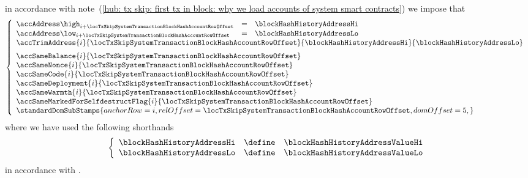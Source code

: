 \item[\underline{Loading the \inst{BLOCKHASH} system smart contract:}] 
	in accordance with
	note~(\ref{hub: tx skip: first tx in block: why we load accounts of system smart contracts})
	we impose that
	\[
		\left\{ \begin{array}{lclr}
			\accAddress  \high _{i + \locTxSkipSystemTransactionBlockHashAccountRowOffset} & = & \blockHashHistoryAddressHi \\
			\accAddress  \low  _{i + \locTxSkipSystemTransactionBlockHashAccountRowOffset} & = & \blockHashHistoryAddressLo \\
			\multicolumn{4}{l}{
				\accTrimAddress
				{i}{\locTxSkipSystemTransactionBlockHashAccountRowOffset}
				{\blockHashHistoryAddressHi}
				{\blockHashHistoryAddressLo}} \vspace{2mm} \\
			\multicolumn{3}{l}{\accSameBalance                       {i}{\locTxSkipSystemTransactionBlockHashAccountRowOffset}} \\
			\multicolumn{3}{l}{\accSameNonce                         {i}{\locTxSkipSystemTransactionBlockHashAccountRowOffset}} \\
			\multicolumn{3}{l}{\accSameCode                          {i}{\locTxSkipSystemTransactionBlockHashAccountRowOffset}} \\
			\multicolumn{3}{l}{\accSameDeployment                    {i}{\locTxSkipSystemTransactionBlockHashAccountRowOffset}} \\
			\multicolumn{3}{l}{\accSameWarmth                        {i}{\locTxSkipSystemTransactionBlockHashAccountRowOffset}} \\
			\multicolumn{3}{l}{\accSameMarkedForSelfdestructFlag     {i}{\locTxSkipSystemTransactionBlockHashAccountRowOffset}} \\
			\multicolumn{3}{l}{
				\standardDomSubStamps {
					anchorRow = i                                                    ,
					relOffset = \locTxSkipSystemTransactionBlockHashAccountRowOffset ,
					domOffset = 5                                                    ,
				}
			} \\
		\end{array} \right.
	\]
	where we have used the following shorthands
	\[
		\left\{ \begin{array}{lcl}
			\blockHashHistoryAddressHi & \define & \blockHashHistoryAddressValueHi \\
			\blockHashHistoryAddressLo & \define & \blockHashHistoryAddressValueLo \\
		\end{array} \right.
	\]
	in accordance with \cite{EIP-2935}.
